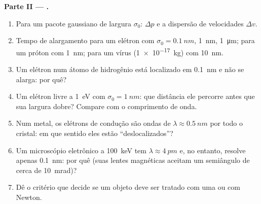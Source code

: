 \begin{problem}
\textbf{Parte II --- .}
\begin{enumerate}[resume]
  \item Para um pacote gaussiano de largura $\sigma_0$: $\Delta p$ e a
        dispersão de velocidades $\Delta v$.
  \item Tempo de alargamento para um elétron com $\sigma_0 = \qty{0.1}{nm}$,
        \qty{1}{nm}, \qty{1}{\micro m}; para um próton com \qty{1}{nm}; para um
        vírus (\qty{1e-17}{kg}) com \qty{10}{nm}.
  \item Um elétron num átomo de hidrogênio está localizado em \qty{0.1}{nm}
        e não se alarga: por quê?
  \item Um elétron livre a \qty{1}{eV} com $\sigma_0 = \qty{1}{nm}$: que distância
        ele percorre antes que sua largura dobre? Compare com o
        comprimento de onda.
  \item Num metal, os elétrons de condução são ondas de $\lambda \approx
        \qty{0.5}{nm}$ por todo o cristal: em que sentido eles estão
        ``deslocalizados''?
  \item Um microscópio eletrônico a \qty{100}{keV} tem $\lambda \approx
        \qty{4}{pm}$ e, no entanto, resolve apenas \qty{0.1}{nm}: por quê (suas lentes
        magnéticas aceitam um semiângulo de cerca de \qty{10}{mrad})?
  \item Dê o critério que decide se um objeto deve ser
        tratado com uma  ou com Newton.
\end{enumerate}


\end{problem}
